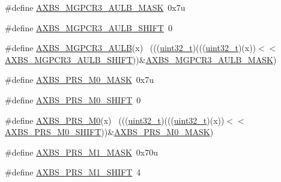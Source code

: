 \begin{DoxyCompactItemize}
\item 
\#define \hyperlink{group___a_x_b_s___register___masks_ga32728cb5c7a9e5bb1d40e3ae1842fa33}{A\+X\+B\+S\+\_\+\+M\+G\+P\+C\+R3\+\_\+\+A\+U\+L\+B\+\_\+\+M\+A\+SK}~0x7u
\item 
\#define \hyperlink{group___a_x_b_s___register___masks_gad9320811473f8962f040b6f8bb2b2bf8}{A\+X\+B\+S\+\_\+\+M\+G\+P\+C\+R3\+\_\+\+A\+U\+L\+B\+\_\+\+S\+H\+I\+FT}~0
\item 
\#define \hyperlink{group___a_x_b_s___register___masks_ga6964b690c17128a29a6160a2b1f3b676}{A\+X\+B\+S\+\_\+\+M\+G\+P\+C\+R3\+\_\+\+A\+U\+LB}(x)                                        ~(((\hyperlink{_p_e___types_8h_a33594304e786b158f3fb30289278f5af}{uint32\+\_\+t})(((\hyperlink{_p_e___types_8h_a33594304e786b158f3fb30289278f5af}{uint32\+\_\+t})(x))$<$$<$\hyperlink{group___a_x_b_s___register___masks_gad9320811473f8962f040b6f8bb2b2bf8}{A\+X\+B\+S\+\_\+\+M\+G\+P\+C\+R3\+\_\+\+A\+U\+L\+B\+\_\+\+S\+H\+I\+FT}))\&\hyperlink{group___a_x_b_s___register___masks_ga32728cb5c7a9e5bb1d40e3ae1842fa33}{A\+X\+B\+S\+\_\+\+M\+G\+P\+C\+R3\+\_\+\+A\+U\+L\+B\+\_\+\+M\+A\+SK})
\item 
\#define \hyperlink{group___a_x_b_s___register___masks_ga9e794f0ace10f0e077a92ce9f5abbb41}{A\+X\+B\+S\+\_\+\+P\+R\+S\+\_\+\+M0\+\_\+\+M\+A\+SK}~0x7u
\item 
\#define \hyperlink{group___a_x_b_s___register___masks_ga86a8f40f6a5d45cd4868dce4833a17d5}{A\+X\+B\+S\+\_\+\+P\+R\+S\+\_\+\+M0\+\_\+\+S\+H\+I\+FT}~0
\item 
\#define \hyperlink{group___a_x_b_s___register___masks_ga6a2c79e55f5424e6d4e863a6f51c8250}{A\+X\+B\+S\+\_\+\+P\+R\+S\+\_\+\+M0}(x)                                                  ~(((\hyperlink{_p_e___types_8h_a33594304e786b158f3fb30289278f5af}{uint32\+\_\+t})(((\hyperlink{_p_e___types_8h_a33594304e786b158f3fb30289278f5af}{uint32\+\_\+t})(x))$<$$<$\hyperlink{group___a_x_b_s___register___masks_ga86a8f40f6a5d45cd4868dce4833a17d5}{A\+X\+B\+S\+\_\+\+P\+R\+S\+\_\+\+M0\+\_\+\+S\+H\+I\+FT}))\&\hyperlink{group___a_x_b_s___register___masks_ga9e794f0ace10f0e077a92ce9f5abbb41}{A\+X\+B\+S\+\_\+\+P\+R\+S\+\_\+\+M0\+\_\+\+M\+A\+SK})
\item 
\#define \hyperlink{group___a_x_b_s___register___masks_ga69131fbb37b2a3eef0e0f135e265e1c0}{A\+X\+B\+S\+\_\+\+P\+R\+S\+\_\+\+M1\+\_\+\+M\+A\+SK}~0x70u
\item 
\#define \hyperlink{group___a_x_b_s___register___masks_gab293a628aa64a93c04ba49fd27326592}{A\+X\+B\+S\+\_\+\+P\+R\+S\+\_\+\+M1\+\_\+\+S\+H\+I\+FT}~4
\item 

\end{DoxyCompactItemize}
